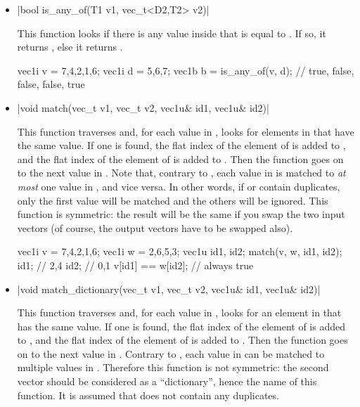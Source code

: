 \documentclass[12pt]{report}
\newcommand*\circled[1]{\tikz[baseline=(char.base)]{
            \node[shape=circle,draw,inner sep=0.0pt] (char) {#1};}}
\newcommand{\vectorfuncsym}{\circled{$\hspace{-1pt}\mathcal{V}$}\xspace}
\newcommand{\vectorfunc}{\vectorfuncsym\hspace{2pt}\xspace}
\newenvironment{example}
{
    \begin{mdframed}[style=example,frametitle={Example}]
}
{
    \end{mdframed}
}
\begin{document}
\begin{itemize}
\item \vectorfunc \cppinline|bool is_any_of(T1 v1, vec_t<D2,T2> v2)| 

This function looks if there is any value inside  that is equal to . If so, it returns , else it returns .

\begin{example}
\begin{cppcode}
vec1i v = {7,4,2,1,6};
vec1i d = {5,6,7};
vec1b b = is_any_of(v, d); // {true, false, false, false, true}
\end{cppcode}
\end{example}

\item \cppinline|void match(vec_t v1, vec_t v2, vec1u& id1, vec1u& id2)| 

This function traverses  and, for each value in , looks for elements in  that have the same value. If one is found, the flat index of the element of  is added to , and the flat index of the element of  is added to . Then the function goes on to the next value in . Note that, contrary to , each value in  is matched to \emph{at most} one value in , and vice versa. In other words, if  or  contain duplicates, only the first value will be matched and the others will be ignored. This function is symmetric: the result will be the same if you swap the two input vectors (of course, the output vectors have to be swapped also).

\begin{example}
\begin{cppcode}
vec1i v = {7,4,2,1,6};
vec1i w = {2,6,5,3};
vec1u id1, id2;
match(v, w, id1, id2);
id1; // {2,4}
id2; // {0,1}
v[id1] == w[id2]; // always true
\end{cppcode}
\end{example}

\item \cppinline|void match_dictionary(vec_t v1, vec_t v2, vec1u& id1, vec1u& id2)| 

This function traverses  and, for each value in , looks for an element in  that has the same value. If one is found, the flat index of the element of  is added to , and the flat index of the element of  is added to . Then the function goes on to the next value in . Contrary to , each value in  can be matched to multiple values in . Therefore this function is not symmetric: the second vector should be considered as a ``dictionary'', hence the name of this function. It is assumed that  does not contain any duplicates.


\end{itemize}
\end{document}
